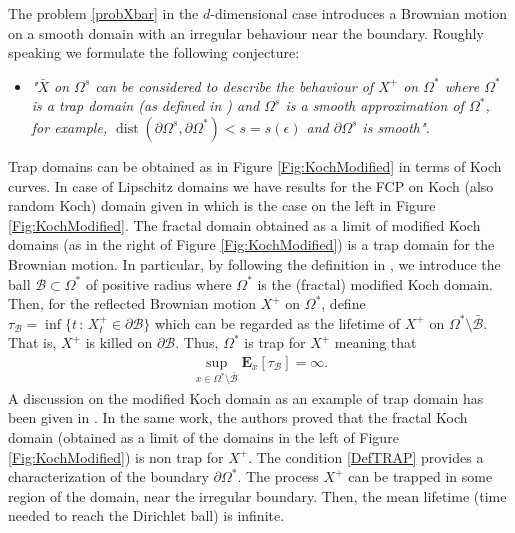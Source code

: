 \documentclass[11pt,a4paper]{article}
\begin{document}
The problem \eqref{probXbar} in the $d$-dimensional case introduces a Brownian motion on a smooth domain with an irregular behaviour near the boundary. Roughly speaking we formulate the following conjecture:
\begin{itemize}
\item[] \begin{minipage}{0.85\textwidth}
{\it "$\bar{X}$ on $\Omega^s$ can be considered to describe the behaviour of $X^+$ on $\Omega^*$ where $\Omega^*$ is a trap domain (as defined in \cite{BCM06}) and $\Omega^s$ is a smooth approximation of $\Omega^*$, for example, $\operatorname{dist}(\partial \Omega^s, \partial \Omega^* ) < s=s(\epsilon)$ and $\partial \Omega^s$ is smooth".}
\end{minipage}
\end{itemize}
Trap domains can be obtained as in Figure \ref{Fig:KochModified} in terms of Koch curves. In case of Lipschitz domains we have results for the FCP on Koch (also random Koch) domain given in \cite{CapDovFCP21} which is the case on the left in Figure \ref{Fig:KochModified}. The fractal domain obtained as a limit of modified Koch domains (as in the right of Figure \ref{Fig:KochModified}) is a trap domain for the Brownian motion. In particular, by following the definition in \cite{BCM06}, we introduce the ball $\mathcal{B} \subset \Omega^*$ of positive radius where $\Omega^*$ is the (fractal) modified Koch domain. Then, for the reflected Brownian motion $X^+$ on $\Omega^*$, define $\tau_{\mathcal{B}} = \inf\{t\, :\, X^+_t \in \partial \mathcal{B}\}$ which can be regarded as the lifetime of $X^+$ on $\Omega^* \setminus \bar{\mathcal{B}}$. That is, $X^+$ is killed on $\partial \mathcal{B}$. Thus, $\Omega^*$ is trap for $X^+$ meaning that
\begin{align}
\sup_{x \in \Omega^* \setminus \bar{\mathcal{B}}} \mathbf{E}_x[\tau_{\mathcal{B}}] = \infty.
\label{DefTRAP}
\end{align}
A discussion on the modified Koch domain as an example of trap domain has been given in \cite{BBC08}. In the same work, the authors proved that the fractal Koch domain (obtained as a limit of the domains in the left of Figure \ref{Fig:KochModified}) is non trap for $X^+$. The condition \eqref{DefTRAP} provides a characterization of the boundary $\partial \Omega^*$. The process $X^+$ can be trapped in some region of the domain, near the irregular boundary. Then, the mean lifetime (time needed to reach the Dirichlet ball) is infinite.
\end{document}
